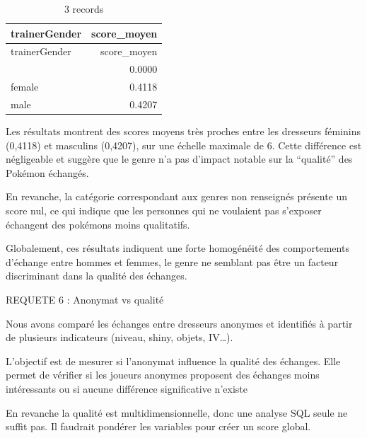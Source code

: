 \documentclass[mstat,12pt]{unswthesis}
\begin{document}
\begin{longtable}[]{@{}lr@{}}
\caption{3 records}\tabularnewline
\toprule\noalign{}
trainerGender & score\_moyen \\
\midrule\noalign{}
\endfirsthead
\toprule\noalign{}
trainerGender & score\_moyen \\
\midrule\noalign{}
\endhead
\bottomrule\noalign{}
\endlastfoot
& 0.0000 \\
female & 0.4118 \\
male & 0.4207 \\
\end{longtable}

Les résultats montrent des scores moyens très proches entre les
dresseurs féminins (0,4118) et masculins (0,4207), sur une échelle
maximale de 6. Cette différence est négligeable et suggère que le genre
n'a pas d'impact notable sur la ``qualité'' des Pokémon échangés.

En revanche, la catégorie correspondant aux genres non renseignés
présente un score nul, ce qui indique que les personnes qui ne voulaient
pas s'exposer échangent des pokémons moins qualitatifs.

Globalement, ces résultats indiquent une forte homogénéité des
comportements d'échange entre hommes et femmes, le genre ne semblant pas
être un facteur discriminant dans la qualité des échanges.

\bigskip

REQUETE 6 : Anonymat vs qualité

\bigskip

Nous avons comparé les échanges entre dresseurs anonymes et identifiés à
partir de plusieurs indicateurs (niveau, shiny, objets, IV\ldots).

L'objectif est de mesurer si l'anonymat influence la qualité des
échanges. Elle permet de vérifier si les joueurs anonymes proposent des
échanges moins intéressants ou si aucune différence significative
n'existe

En revanche la qualité est multidimensionnelle, donc une analyse SQL
seule ne suffit pas. Il faudrait pondérer les variables pour créer un
score global.
\end{document}
